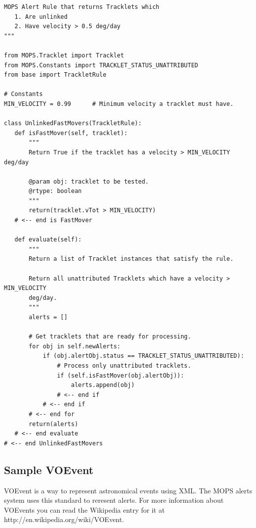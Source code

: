 \documentclass[panstarrs]{panstarrs}
\begin{document}
\begin{appendices}
\begin{verbatim}
MOPS Alert Rule that returns Tracklets which
   1. Are unlinked
   2. Have velocity > 0.5 deg/day
"""

from MOPS.Tracklet import Tracklet
from MOPS.Constants import TRACKLET_STATUS_UNATTRIBUTED
from base import TrackletRule

# Constants
MIN_VELOCITY = 0.99      # Minimum velocity a tracklet must have.            

class UnlinkedFastMovers(TrackletRule):
   def isFastMover(self, tracklet):
       """
       Return True if the tracklet has a velocity > MIN_VELOCITY deg/day

       @param obj: tracklet to be tested.
       @rtype: boolean
       """
       return(tracklet.vTot > MIN_VELOCITY)
   # <-- end is FastMover
   
   def evaluate(self):
       """
       Return a list of Tracklet instances that satisfy the rule.

       Return all unattributed Tracklets which have a velocity > MIN_VELOCITY 
       deg/day.
       """
       alerts = []

       # Get tracklets that are ready for processing.
       for obj in self.newAlerts:
           if (obj.alertObj.status == TRACKLET_STATUS_UNATTRIBUTED):
               # Process only unattributed tracklets.
               if (self.isFastMover(obj.alertObj)):
                   alerts.append(obj)
               # <-- end if
           # <-- end if
       # <-- end for
       return(alerts)
   # <-- end evaluate
# <-- end UnlinkedFastMovers
\end{verbatim}


\subsection{Sample VOEvent}
VOEvent is a way to represent astronomical events using XML. The MOPS alerts system uses this standard to reresent alerts. For more information about VOEvents you can read the Wikipedia entry for it at http://en.wikipedia.org/wiki/VOEvent.


\end{appendices}
\end{document}
